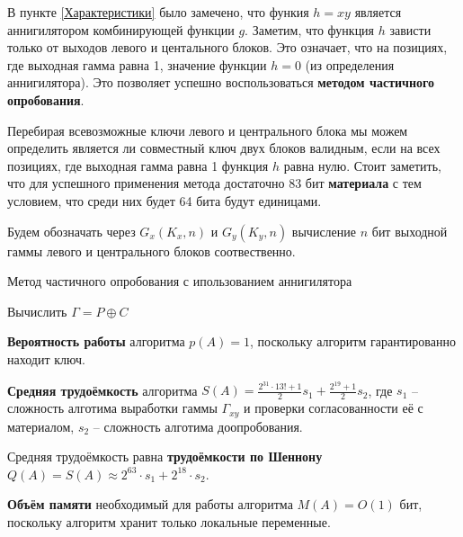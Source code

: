 \documentclass[a4paper,12pt]{article}
\theoremstyle{definition}
\begin{document}
	В пункте \ref{Характеристики} было замечено, что функия $h=x y$ является аннигилятором комбинирующей функции $g$. Заметим, что функция $h$ зависти только от выходов левого и центального блоков. Это означает, что на позициях, где выходная гамма равна 1, значение функции $h=0$ (из определения аннигилятора). Это позволяет успешно воспользоваться \textbf{методом частичного опробования}.
	
	Перебирая всевозможные ключи левого и центрального блока мы можем определить является ли совместный ключ двух блоков валидным, если на всех позициях, где выходная гамма равна 1 функция $h$ равна нулю. Стоит заметить, что для успешного применения метода достаточно 83 бит \textbf{материала} с тем условием, что среди них будет 64 бита будут единицами.
	
	Будем обозначать через $G_x(K_x, n)$ и $G_y(K_y, n)$ вычисление $n$ бит выходной гаммы левого и центрального блоков соотвественно.
	
	
	\begin{algorithm}[H]
		
		\caption{Метод частичного опробования с ипользованием аннигилятора}
		\label{alg:Annig}
		\SetAlgoNoEnd
		
		
		Вычислить $\Gamma = P \oplus C $ 
		
	\end{algorithm}	

	\textbf{Вероятность работы} алгоритма $p(A)=1$, поскольку алгоритм гарантированно находит ключ. 
	
	\textbf{Средняя трудоёмкость} алгоритма $S(A)= \frac{2^{31} \cdot 13! + 1}{2} s_1 + \frac{2^{19} + 1}{2} s_2$, где $s_1$ -- сложность алготима выработки гаммы $\Gamma_{x y}$ и проверки согласованности её с материалом, $s_2$ -- сложность алготима доопробования. 
	
	Средняя трудоёмкость равна \textbf{трудоёмкости по Шеннону} $Q(A) = S(A) \approx 2^{63} \cdot s_1 + 2^{18} \cdot s_2$.
	
	\textbf{Объём памяти} необходимый для работы алгоритма $M(A) = O(1)$ бит, поскольку алгоритм хранит только локальные переменные.
			
			
\end{document}

